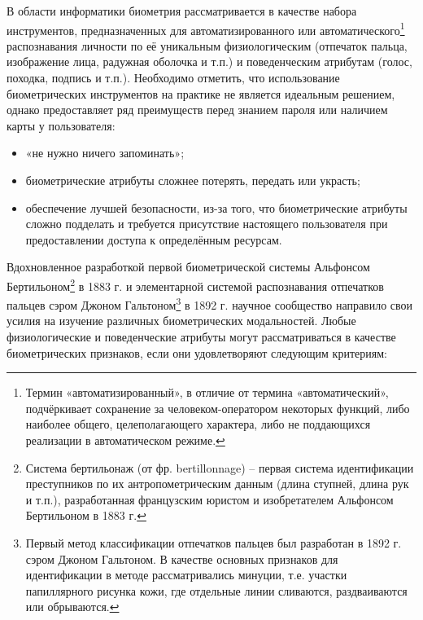 \documentclass[12pt]{book}
\begin{document}
\large{В области информатики биометрия рассматривается в качестве набора инструментов, предназначенных для автоматизированного или автоматического\footnote{Термин «автоматизированный», в отличие от термина «автоматический», подчёркивает сохранение за человеком-оператором некоторых функций, либо наиболее общего, целеполагающего характера, либо не поддающихся реализации в автоматическом режиме.} распознавания личности по её уникальным физиологическим (отпечаток пальца, изображение лица, радужная оболочка и т.п.) и поведенческим атрибутам (голос, походка, подпись и т.п.). Необходимо отметить, что использование биометрических инструментов на практике не является идеальным решением, однако предоставляет ряд преимуществ перед знанием пароля или наличием карты у пользователя: 

\begin{itemize}[topsep=1pt] \itemsep0.1em
\item «не нужно ничего запоминать»;
\item биометрические атрибуты сложнее потерять, передать или украсть;
\item обеспечение лучшей безопасности, из-за того, что биометрические атрибуты сложно подделать и требуется присутствие настоящего пользователя при предоставлении доступа к определённым ресурсам.
\end{itemize}

Вдохновленное разработкой первой биометрической системы Альфонсом Бертильоном\footnote{Система бертильонаж (от фр. bertillonnage) -- первая система идентификации преступников по их антропометрическим данным (длина ступней, длина рук и т.п.), разработанная французским юристом и изобретателем Альфонсом Бертильоном в 1883 г.} в 1883 г. и элементарной системой распознавания отпечатков пальцев сэром Джоном Гальтоном\footnote{Первый метод классификации отпечатков пальцев был разработан в 1892 г. сэром Джоном Гальтоном. В качестве основных признаков для идентификации в методе рассматривались минуции, т.е. участки папиллярного рисунка кожи, где отдельные линии сливаются, раздваиваются или обрываются.} в 1892 г. научное сообщество направило свои усилия на изучение различных биометрических модальностей. Любые физиологические и поведенческие атрибуты могут рассматриваться в качестве биометрических признаков, если они удовлетворяют следующим критериям: 

}
\end{document}
